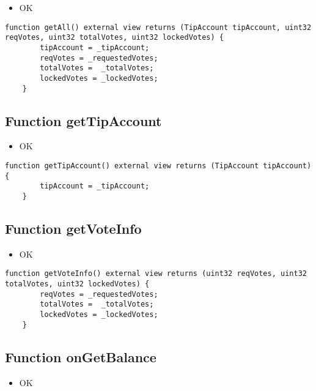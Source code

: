 \begin{itemize}
\item OK
\end{itemize}

\begin{lstlisting}[firstnumber=207]
    function getAll() external view returns (TipAccount tipAccount, uint32 reqVotes, uint32 totalVotes, uint32 lockedVotes) {
        tipAccount = _tipAccount;
        reqVotes = _requestedVotes;
        totalVotes =  _totalVotes;
        lockedVotes = _lockedVotes;
    }
\end{lstlisting}

\subsection{Function getTipAccount}

\begin{itemize}
\item OK
\end{itemize}

\begin{lstlisting}[firstnumber=214]
    function getTipAccount() external view returns (TipAccount tipAccount) {
        tipAccount = _tipAccount;
    }
\end{lstlisting}

\subsection{Function getVoteInfo}

\begin{itemize}
\item OK
\end{itemize}

\begin{lstlisting}[firstnumber=218]
    function getVoteInfo() external view returns (uint32 reqVotes, uint32 totalVotes, uint32 lockedVotes) {
        reqVotes = _requestedVotes;
        totalVotes =  _totalVotes;
        lockedVotes = _lockedVotes;
    }
\end{lstlisting}

\subsection{Function onGetBalance}

\begin{itemize}
\item OK
\end{itemize}

